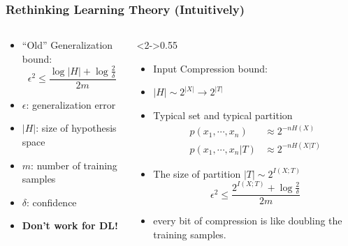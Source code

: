 \documentclass{beamer}
\begin{document}
\begin{frame}
    \frametitle{Rethinking Learning Theory (Intuitively)}
    \begin{columns}[T]
        \begin{column}{0.45\textwidth}
            \begin{itemize}
                \item ``Old'' Generalization bound:
                \begin{equation*}
                    \epsilon^2 \leq \frac{\log|H|+\log\frac{2}{\delta}}{2m}
                \end{equation*}
                \item $\epsilon$: generalization error
                \item $|H|$: size of hypothesis space
                \item $m$: number of training samples
                \item $\delta$: confidence
                \item \textbf{Don't work for DL!} 
            \end{itemize}
        \end{column}
        \begin{column}<2->{0.55\textwidth}
            \begin{itemize}
                \item Input Compression bound:
                \item $|H|\sim 2^{|X|}\to 2^{|T|}$
                \item Typical set and typical partition
                \begin{align*}
                    p(x_1,\cdots,x_n) & \approx 2^{-nH(X)}\\
                    p(x_1,\cdots,x_n|T)& \approx 2^{-nH(X|T)}
                \end{align*}
                \item The size of partition $|T|\sim 2^{I(X;T)}$
                \begin{equation*}
                    \epsilon^2\leq \frac{2^{I(X;T)}+\log\frac{2}{\delta}}{2m}
                \end{equation*}
                \item every bit of compression is like doubling the training samples.
            \end{itemize}
        \end{column}
    \end{columns}
\end{frame}
\end{document}

